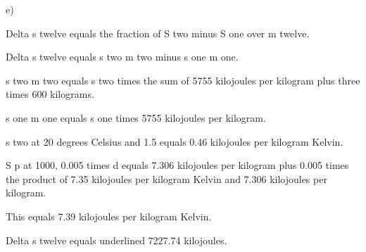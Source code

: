 e)

Delta s twelve equals the fraction of S two minus S one over m twelve.

Delta s twelve equals s two m two minus s one m one.

s two m two equals s two times the sum of 5755 kilojoules per kilogram plus three times 600 kilograms.

s one m one equals s one times 5755 kilojoules per kilogram.

s two at 20 degrees Celsius and 1.5 equals 0.46 kilojoules per kilogram Kelvin.

S p at 1000, 0.005 times d equals 7.306 kilojoules per kilogram plus 0.005 times the product of 7.35 kilojoules per kilogram Kelvin and 7.306 kilojoules per kilogram.

This equals 7.39 kilojoules per kilogram Kelvin.

Delta s twelve equals underlined 7227.74 kilojoules.